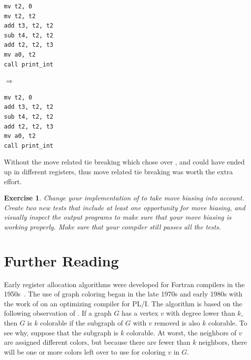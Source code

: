 \documentclass[7x10]{TimesAPriori_MIT}%
\newtheorem{exercise}[theorem]{Exercise}
\numberwithin{theorem}{chapter}
\numberwithin{definition}{chapter}
\numberwithin{equation}{chapter}
\begin{document}
{{\begin{center}
\begin{minipage}{0.20\textwidth}
\begin{lstlisting}
mv t2, 0
mv t2, t2
add t3, t2, t2
sub t4, t2, t2
add t2, t2, t3
mv a0, t2
call print_int
\end{lstlisting}
\end{minipage}
${\Rightarrow\qquad}$
\begin{minipage}{0.20\textwidth}
\begin{lstlisting}
mv t2, 0
add t3, t2, t2
sub t4, t2, t2
add t2, t2, t3
mv a0, t2
call print_int
\end{lstlisting}
\end{minipage}
\end{center}
\fi}
Without the move related tie breaking which chose  over ,  and  could have
ended up in different registers, thus move related tie breaking was worth the extra effort.
\fi}

\begin{exercise}\normalfont\normalsize
Change your implementation of  to take move
biasing into account. Create two new tests that include at least one
opportunity for move biasing, and visually inspect the output {\ArchName}
programs to make sure that your move biasing is working properly. Make
sure that your compiler still passes all the tests.
\end{exercise}







\section{Further Reading}
\label{sec:register-allocation-further-reading}

Early register allocation algorithms were developed for Fortran
compilers in the 1950s~\citep{Horwitz:1966aa,Backus:1978aa}.  The use
of graph coloring began in the late 1970s and early 1980s with the
work of \citet{Chaitin:1981vl} on an optimizing compiler for PL/I. The
algorithm is based on the following observation of
\citet{Kempe:1879aa}. If a graph $G$ has a vertex $v$ with degree
lower than $k$, then $G$ is $k$ colorable if the subgraph of $G$ with
$v$ removed is also $k$ colorable. To see why, suppose that the
subgraph is $k$ colorable.  At worst, the neighbors of $v$ are assigned
different colors, but because there are fewer than $k$ neighbors, there
will be one or more colors left over to use for coloring $v$ in $G$.
\end{document}
